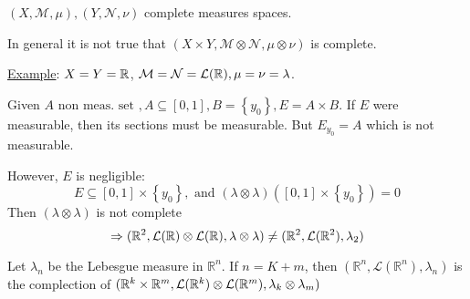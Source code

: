 \begin{remark} 
    \(\left(X, \mathcal{M}, \mu \right), \left(Y, \mathcal{N}, \nu \right)\) complete measures spaces. 
    
    In general it is not true that \((X \times Y, \mathcal{M} \otimes \mathcal{N}, \mu \otimes \nu)\) is complete.
\end{remark}
\noindent\underline{Example}: \(X = Y = \mathbb{R}\), \(\mathcal{M} = \mathcal{N} = \mathcal{L}(\mathbb{R}), \mu = \nu = \lambda\).

Given \(A \mbox{ non meas. set }, A \subseteq [0,1], B = \left\{ y_0 \right\}, E = A \times B\). 
If \(E\) were measurable, then its sections must be measurable. But \(E_{y_0} = A\) which is not measurable.

However, \(E\) is negligible:
\[
    E \subseteq [0,1] \times \left\{ y_0 \right\}, \mbox{ and } \left(\lambda \otimes \lambda\right)\left([0,1] \times \left\{ y_0 \right\}\right) = 0
\]
Then \((\lambda \otimes \lambda)\) is not complete 
\[
    \Rightarrow (\mathbb{R}^2, \mathcal{L}(\mathbb{R}) \otimes \mathcal{L}(\mathbb{R}), \lambda \otimes \lambda) \neq (\mathbb{R}^2, \mathcal{L}(\mathbb{R}^2), \lambda_2)
\]
\begin{theorem}
    Let \(\lambda_n\) be the Lebesgue measure in \(\mathbb{R}^n\). 
    If \(n= K+m\), then \(\left(\mathbb{R}^n, \mathcal{L}(\mathbb{R}^n), \lambda_n \right)\) is the complection of \( ( \mathbb{R}^k \times \mathbb{R}^m, \mathcal{L}(\mathbb{R}^k) \otimes \mathcal{L}(\mathbb{R}^m),\lambda_k \otimes \lambda_m )\)
\end{theorem}
